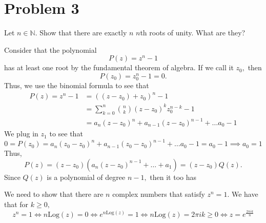\documentclass[11pt]{article}
\newcommand{\bbN}{\mathbb{N}}
\begin{document}
\newpage
\section*{Problem 3}
\begin{problem}
    Let $n \in \bbN.$ Show that there are exactly $n$ $n$th roots of unity. What are they?
\end{problem}
\begin{solution}
Consider that the polynomial 
\[P(z)= z^n - 1\] has at least one root by the fundamental theorem of algebra. If we call it $z_0,$ then 
\[P(z_0) = z_0^n - 1 = 0.\] Thus, we use the binomial formula to see that
\begin{align*}
P(z) = z^n - 1 &= ((z - z_0) + z_0)^n - 1\\ &= \sum_{k=0}^n\binom{n}{k}(z - z_0)^{k}z_0^{n-k} - 1\\
&= a_n(z - z_0)^n + a_{n-1}(z - z_0)^{n-1} + \dots a_{0}- 1
\end{align*}
We plug in $z_1$ to see that
\[ 0 = P(z_0) =a_n(z_0 - z_0)^n + a_{n-1}(z_0 - z_0)^{n-1} + \dots a_{0}- 1  = a_0 - 1\implies a_0 = 1\]
Thus, 
\[P(z) = (z - z_0) (a_n(z - z_0)^{n-1} + \dots + a_1) = (z -z_0) Q(z).\] Since $Q(z)$ is a polynomial of degree $n-1,$ then it too has 


    We need to show that there are $n$ complex numbers that satisfy $z^n = 1.$ 
We have that for $k\geq 0,$
\[z^n = 1 \iff n\text{Log}(z) = 0 \iff e^{n\text{Log}(z)} = 1 \iff n\text{Log}(z) = 2\pi i k \geq 0 \iff z = e^{\frac{2\pi i k}{n}}\]
\end{solution}

\newpage
\end{document}
